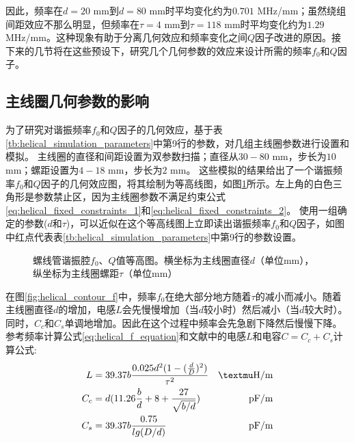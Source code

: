 因此，频率在$d=20$ mm到$d=80$ mm时平均变化约为$0.701$ MHz/mm；虽然绕组间距效应不那么明显，但频率在$\tau=4$ mm到$\tau=118$ mm时平均变化约为$1.29$ MHz/mm。这种现象有助于分离几何效应和频率变化之间$ Q $因子改进的原因。接下来的几节将在这些预设下，研究几个几何参数的效应来设计所需的频率$f_0$和$Q$因子。
\subsection[主线圈几何参数的影响]{主线圈几何参数的影响}

为了研究对谐振频率$f_0$和$Q$因子的几何效应，基于表\ref{tb:helical_simulation_parameters}中第9行的参数，对几组主线圈参数进行设置和模拟。
主线圈的直径和间距设置为双参数扫描；直径从$30-80$ mm，步长为$10$ mm；螺距设置为$4-18$ mm，步长为$2$ mm。
这些模拟的结果给出了一个谐振频率$f_0$和$Q$因子的几何效应图，将其绘制为等高线图，如图\ref{fig:helical_contour}所示。左上角的白色三角形是参数禁止区，因为主线圈参数不满足约束公式\eqref{eq:helical_fixed_constraints_1}和\eqref{eq:helical_fixed_constraints_2}。
使用一组确定的参数($d$和$\tau$)，可以近似在这个等高线图上立即读出谐振频率$f_0$和$Q$因子，如图中红点代表表\ref{tb:helical_simulation_parameters}中第9行的参数设置。

\begin{figure}
    \centering
    \caption[螺线管谐振腔$f_0$、$Q$值等高图]{螺线管谐振腔$f_0$、$Q$值等高图。横坐标为主线圈直径$d$（单位mm），纵坐标为主线圈螺距$\tau$（单位mm）\label{fig:helical_contour}}
\end{figure}

在图\ref{fig:helical_contour_f}中，频率$f_0$在绝大部分地方随着$\tau$的减小而减小。随着主线圈直径$d$的增加，电感$L$会先慢慢增加（当$d$较小时）然后减小（当$d$较大时）。同时，$C_c$和$C_s$单调地增加。因此在这个过程中频率会先急剧下降然后慢慢下降。参考频率计算公式\eqref{eq:helical_f_equation}和文献\cite[]{Siverns_Simkins_Weidt_Hensinger_2012,Macalpine_Schildknecht_1959}中的电感$L$和电容$C = C_c +C_s$计算公式:
\begin{align}
    L&=39.37b\frac{0.025d^2(1-(\frac{d}{D})^2)}{\tau^2} &\mu \textnormal{H/m} \label{eq:helical_L} \\
	C_c&=d(11.26\frac{b}{d}+8+\frac{27}{\sqrt{b/d}})  &\textnormal{pF/m} \label{eq:helical_C_c}\\
	C_s&=39.37b\frac{0.75}{lg(D/d)} &\textnormal{pF/m} \label{eq:helical_C_s}
\end{align}

